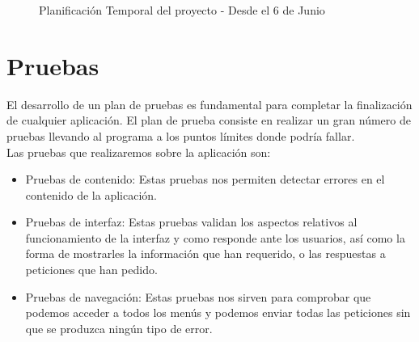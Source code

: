 \documentclass[a4paper,12pt]{article}
\begin{document}
\pagebreak
\begin{figure}[H]
\caption{Planificación Temporal del proyecto - Desde el 6 de Junio}
\end{figure}

\section{Pruebas}

El desarrollo de un plan de pruebas es fundamental para completar la finalización de cualquier aplicación. El plan de prueba consiste en realizar un gran número de pruebas llevando al programa a los puntos límites donde podría fallar.\\

Las pruebas que realizaremos sobre la aplicación son:
\begin{itemize}
\item Pruebas de contenido: Estas pruebas nos permiten detectar errores en el contenido de la aplicación.
\item Pruebas de interfaz: Estas pruebas validan los aspectos relativos al funcionamiento de la interfaz y como responde ante los usuarios, así como la forma de mostrarles la información que han requerido, o las respuestas a peticiones que han pedido.
\item Pruebas de navegación: Estas pruebas nos sirven para comprobar que podemos acceder a todos los menús y podemos enviar todas las peticiones sin que se produzca ningún tipo de error.
\end{itemize}
\end{document}

